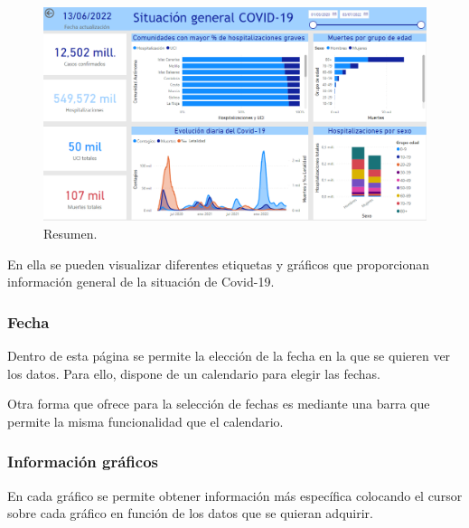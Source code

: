 \begin{figure}[h]
    \advance\leftskip-0.5cm 
    \includegraphics[scale=0.55]{img/powerBI_resumen.PNG}
    \caption{Resumen.}
\end{figure}

En ella se pueden visualizar diferentes etiquetas y gráficos que proporcionan información general de la situación de Covid-19.

\subsubsection{Fecha}
Dentro de esta página se permite la elección de la fecha en la que se quieren ver los datos.
Para ello, dispone de un calendario para elegir las fechas.


Otra forma que ofrece para la selección de fechas es mediante una barra que permite la misma funcionalidad que el calendario.

\subsubsection{Información gráficos}
En cada gráfico se permite obtener información más específica colocando el cursor sobre cada gráfico en función de los datos que se quieran adquirir.

